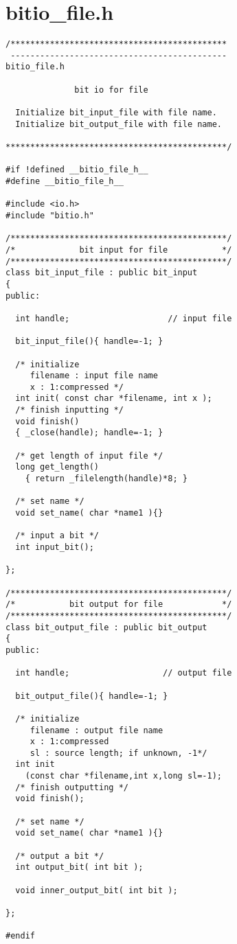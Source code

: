 \section{bitio\_file.h}
\begin{verbatim}
/********************************************
 --------------------------------------------
bitio_file.h

              bit io for file

  Initialize bit_input_file with file name.
  Initialize bit_output_file with file name.

*********************************************/

#if !defined __bitio_file_h__
#define __bitio_file_h__

#include <io.h>
#include "bitio.h"

/********************************************/
/*             bit input for file           */
/********************************************/
class bit_input_file : public bit_input
{
public:

  int handle;                    // input file

  bit_input_file(){ handle=-1; }

  /* initialize
     filename : input file name
     x : 1:compressed */
  int init( const char *filename, int x );
  /* finish inputting */
  void finish()
  { _close(handle); handle=-1; }

  /* get length of input file */
  long get_length()
    { return _filelength(handle)*8; }

  /* set name */
  void set_name( char *name1 ){}

  /* input a bit */
  int input_bit();

};

/********************************************/
/*           bit output for file            */
/********************************************/
class bit_output_file : public bit_output
{
public:

  int handle;                   // output file

  bit_output_file(){ handle=-1; }

  /* initialize
     filename : output file name
     x : 1:compressed
     sl : source length; if unknown, -1*/
  int init
    (const char *filename,int x,long sl=-1);
  /* finish outputting */
  void finish();

  /* set name */
  void set_name( char *name1 ){}

  /* output a bit */
  int output_bit( int bit );

  void inner_output_bit( int bit );

};

#endif
\end{verbatim}
